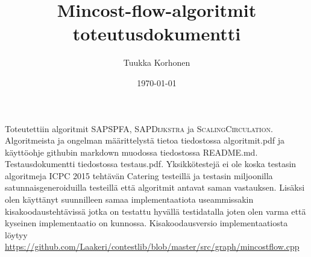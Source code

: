 \documentclass[a4paper, 11pt]{article}
\title{Mincost-flow-algoritmit toteutusdokumentti}
\author{Tuukka Korhonen}
\date{\today}
\begin{document}
\maketitle
\noindent
Toteutettiin algoritmit \textsc{SAPSPFA}, \textsc{SAPDijkstra} ja \textsc{ScalingCirculation}.
Algoritmeista ja ongelman määrittelystä tietoa tiedostossa algoritmit.pdf ja käyttöohje
githubin markdown muodossa tiedostossa README.md. Testausdokumentti tiedostossa testaus.pdf.
Yksikkötestejä ei ole koska testasin algoritmeja ICPC 2015 tehtävän Catering testeillä
ja testasin miljoonilla satunnaisgeneroiduilla testeillä että algoritmit antavat
saman vastauksen.
Lisäksi olen käyttänyt suunnilleen samaa implementaatiota useammissakin kisakoodaustehtävissä
jotka on testattu hyvällä testidatalla joten olen varma että kyseinen implementaatio
on kunnossa. Kisakoodausversio implementaatiosta löytyy \hyperref[https://github.com/Laakeri/contestlib/blob/master/src/graph/mincostflow.cpp]{https://github.com/Laakeri/contestlib/blob/master/src/graph/mincostflow.cpp}
\end{document}
